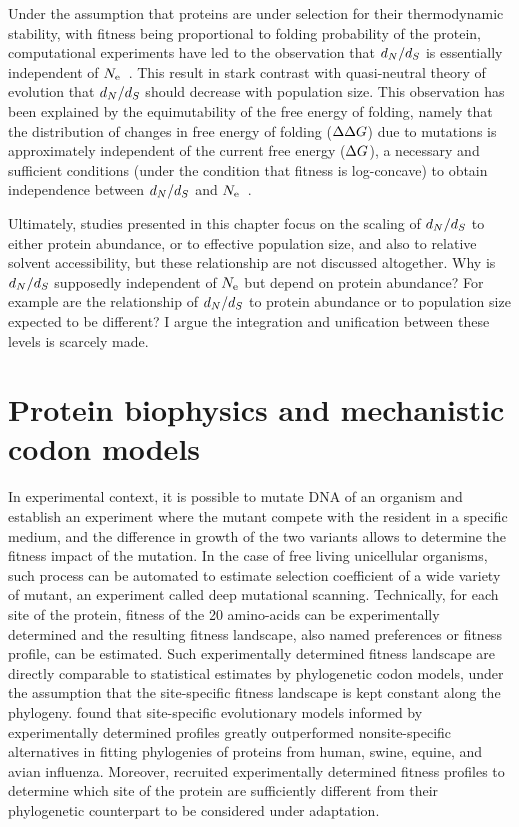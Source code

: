 Under the assumption that proteins are under selection for their thermodynamic stability, with fitness being proportional to folding probability of the protein, computational experiments have led to the observation that $d_N / d_S$ is essentially independent of $N_{\textrm{e}}$~\citep{Goldstein2013}.
This result in stark contrast with quasi-neutral theory of evolution that $d_N / d_S$ should decrease with population size.
This observation has been explained by the equimutability of the free energy of folding, namely that the distribution of changes in free energy of folding ($\Delta \Delta G$) due to mutations is approximately independent of the current free energy ($\Delta G$), a necessary and sufficient conditions (under the condition that fitness is log-concave) to obtain independence between $d_N / d_S$ and $N_{\textrm{e}}$~\citep{Cherry1998}.

Ultimately, studies presented in this chapter focus on the scaling of $d_N / d_S$ to either protein abundance, or to effective population size, and also to relative solvent accessibility, but these relationship are not discussed altogether.
Why is $d_N / d_S$ supposedly independent of $N_{\textrm{e}}$ but depend on protein abundance?
For example are the relationship of $d_N / d_S$ to protein abundance or to population size expected to be different?
I argue the integration and unification between these levels is scarcely made.

\section{Protein biophysics and mechanistic codon models}

In experimental context, it is possible to mutate DNA of an organism and establish an experiment where the mutant compete with the resident in a specific medium, and the difference in growth of the two variants allows to determine the fitness impact of the mutation.
In the case of free living unicellular organisms, such process can be automated to estimate selection coefficient of a wide variety of mutant, an experiment called deep mutational scanning.
Technically, for each site of the protein, fitness of the 20 amino-acids can be experimentally determined and the resulting fitness landscape, also named preferences or fitness profile, can be estimated.
Such experimentally determined fitness landscape are directly comparable to statistical estimates by phylogenetic codon models, under the assumption that the site-specific fitness landscape is kept constant along the phylogeny.
\citet{Doud2015} found that site-specific evolutionary models informed by experimentally determined profiles greatly outperformed nonsite-specific alternatives in fitting phylogenies of proteins from human, swine, equine, and avian influenza. 
Moreover, \citet{Bloom2017} recruited experimentally determined fitness profiles to determine which site of the protein are sufficiently different from their phylogenetic counterpart to be considered under adaptation.

